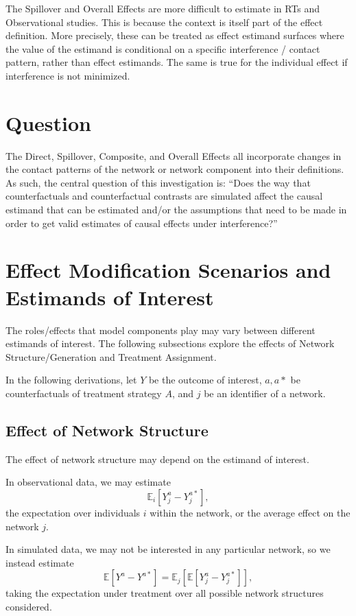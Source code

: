 \documentclass{article}
\theoremstyle{definition}
\begin{document}
The Spillover and Overall Effects are more difficult to estimate in RTs and Observational studies. This is because the context is itself part of the effect definition. More precisely, these can be treated as effect estimand surfaces where the value of the estimand is conditional on a specific interference / contact pattern, rather than effect estimands. The same is true for the individual effect if interference is not minimized.

\section{Question}
The Direct, Spillover, Composite, and Overall Effects all incorporate changes in the contact patterns of the network or network component into their definitions. As such, the central question of this investigation is: ``Does the way that counterfactuals and counterfactual contrasts are simulated affect the causal estimand that can be estimated and/or the assumptions that need to be made in order to get valid estimates of causal effects under interference?''

\section{Effect Modification Scenarios and Estimands of Interest}
The roles/effects that model components play may vary between different estimands of interest. The following subsections explore the effects of Network Structure/Generation and Treatment Assignment. 

In the following derivations, let $Y$ be the outcome of interest, $a,a*$ be counterfactuals of treatment strategy $A$, and $j$ be an identifier of a network.
\subsection{Effect of Network Structure}
The effect of network structure may depend on the estimand of interest. 

In observational data, we may estimate
\begin{equation}\label{eq:1}
    \mathbb{E}_{i}\left[Y_{j}^{a}-Y_{j}^{a*}\right],
\end{equation}
the expectation over individuals $i$ within the network, or the average effect on the network $j$.

In simulated data, we may not be interested in any particular network, so we instead estimate
\begin{equation}\label{eq:2}
    \mathbb{E}\left[Y^{a}-Y^{a*}\right]=\mathbb{E}_{j}\left[\mathbb{E}\left[Y_{j}^{a}-Y_{j}^{a*}\right]\right],
\end{equation}
taking the expectation under treatment over all possible network structures considered. 
\end{document}
